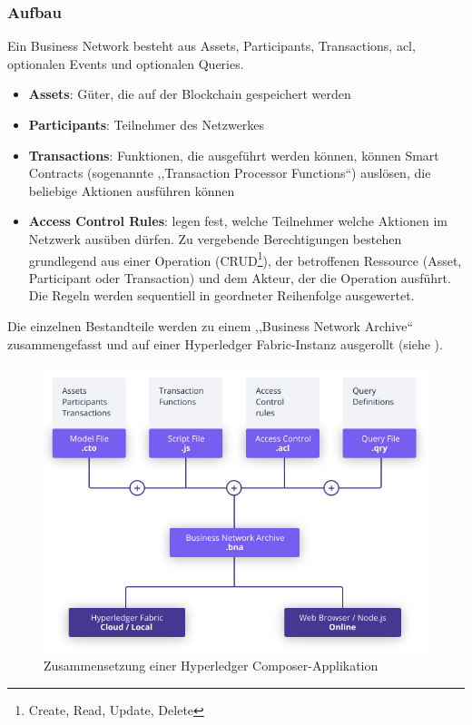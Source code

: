         \subsubsection*{Aufbau}
        Ein Business Network besteht aus Assets, Participants, Transactions, \gls{acl}, optionalen Events und optionalen Queries.
        \begin{itemize}[noitemsep]
            \item \textbf{Assets}: Güter, die auf der Blockchain gespeichert werden
            \item \textbf{Participants}: Teilnehmer des Netzwerkes
            \item \textbf{Transactions}: Funktionen, die ausgeführt werden können, können Smart Contracts (sogenannte ,,Transaction Processor Functions``) auslösen, die  beliebige Aktionen ausführen können
            \item \textbf{Access Control Rules}: legen fest, welche Teilnehmer welche Aktionen im Netzwerk ausüben dürfen. 
                Zu vergebende Berechtigungen bestehen grundlegend aus einer Operation (CRUD\!\footnote{Create, Read, Update, Delete}), der betroffenen Ressource (Asset, Participant oder Transaction) und dem Akteur, der die Operation ausführt.
                Die Regeln werden sequentiell in geordneter Reihenfolge ausgewertet. 
        \end{itemize}
        Die einzelnen Bestandteile werden zu einem ,,Business Network Archive`` zusammengefasst und auf einer Hyperledger Fabric-Instanz ausgerollt (siehe ).
        
        \begin{figure}[H]
    		\centering
    		\includegraphics[width=\textwidth]{graphics/Composer-Diagram.png}
    		\caption[Zusammensetzung einer Hyperledger Composer-Applikation]{Zusammensetzung einer Hyperledger Composer-Applikation\cite{ComposerDocs}}
    		\label{fig:composer_arch}
    	\end{figure}
        
